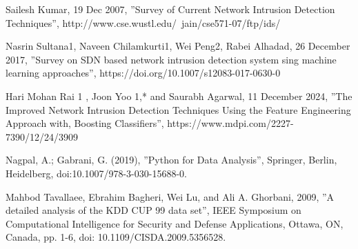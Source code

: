 \documentclass[conference]{IEEEtran}
\begin{document}
\begin{thebibliography}{00}
     Sailesh Kumar, 19 Dec 2007, ''Survey of Current Network Intrusion Detection Techniques'', http://www.cse.wustl.edu/~jain/cse571-07/ftp/ids/
    
     Nasrin Sultana1, Naveen Chilamkurti1, Wei Peng2, Rabei Alhadad, 26 December 2017, ''Survey on SDN based network intrusion detection system sing machine learning approaches'', https://doi.org/10.1007/s12083-017-0630-0
    
     Hari Mohan Rai 1 , Joon Yoo 1,* and Saurabh Agarwal, 11 December 2024, ''The Improved Network Intrusion Detection Techniques Using the Feature Engineering Approach with, Boosting Classifiers'', https://www.mdpi.com/2227-7390/12/24/3909

     Nagpal, A.; Gabrani, G. (2019), ''Python for Data Analysis'', Springer, Berlin, Heidelberg, doi:10.1007/978-3-030-15688-0.
    
     Mahbod Tavallaee, Ebrahim Bagheri, Wei Lu, and Ali A. Ghorbani, 2009, ''A detailed analysis of the KDD CUP 99 data set'', IEEE Symposium on Computational Intelligence for Security and Defense Applications, Ottawa, ON, Canada, pp. 1-6, doi: 10.1109/CISDA.2009.5356528.
    
\end{thebibliography}

\end{document}
